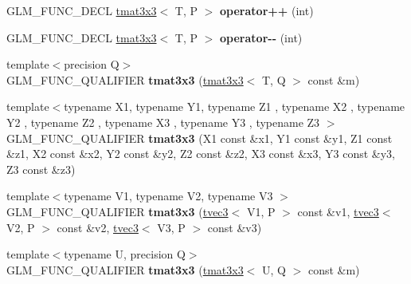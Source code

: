 \begin{DoxyCompactItemize}
\item 
G\+L\+M\+\_\+\+F\+U\+N\+C\+\_\+\+D\+E\+CL \hyperlink{structglm_1_1detail_1_1tmat3x3}{tmat3x3}$<$ T, P $>$ {\bfseries operator++} (int)\hypertarget{structglm_1_1detail_1_1tmat3x3_a42b606493a76f7246e3c4b6a0e10b064}{}\label{structglm_1_1detail_1_1tmat3x3_a42b606493a76f7246e3c4b6a0e10b064}

\item 
G\+L\+M\+\_\+\+F\+U\+N\+C\+\_\+\+D\+E\+CL \hyperlink{structglm_1_1detail_1_1tmat3x3}{tmat3x3}$<$ T, P $>$ {\bfseries operator-\/-\/} (int)\hypertarget{structglm_1_1detail_1_1tmat3x3_a9a9c2ddae87b15a9a7d7000dcd41e27a}{}\label{structglm_1_1detail_1_1tmat3x3_a9a9c2ddae87b15a9a7d7000dcd41e27a}

\item 
{\footnotesize template$<$precision Q$>$ }\\G\+L\+M\+\_\+\+F\+U\+N\+C\+\_\+\+Q\+U\+A\+L\+I\+F\+I\+ER {\bfseries tmat3x3} (\hyperlink{structglm_1_1detail_1_1tmat3x3}{tmat3x3}$<$ T, Q $>$ const \&m)\hypertarget{structglm_1_1detail_1_1tmat3x3_a2b14034fffb8d3dd7f1d6d24131f7510}{}\label{structglm_1_1detail_1_1tmat3x3_a2b14034fffb8d3dd7f1d6d24131f7510}

\item 
{\footnotesize template$<$typename X1, typename Y1, typename Z1 , typename X2 , typename Y2 , typename Z2 , typename X3 , typename Y3 , typename Z3 $>$ }\\G\+L\+M\+\_\+\+F\+U\+N\+C\+\_\+\+Q\+U\+A\+L\+I\+F\+I\+ER {\bfseries tmat3x3} (X1 const \&x1, Y1 const \&y1, Z1 const \&z1, X2 const \&x2, Y2 const \&y2, Z2 const \&z2, X3 const \&x3, Y3 const \&y3, Z3 const \&z3)\hypertarget{structglm_1_1detail_1_1tmat3x3_a6bc248bf277f1e4c97480b964301a9e2}{}\label{structglm_1_1detail_1_1tmat3x3_a6bc248bf277f1e4c97480b964301a9e2}

\item 
{\footnotesize template$<$typename V1, typename V2, typename V3 $>$ }\\G\+L\+M\+\_\+\+F\+U\+N\+C\+\_\+\+Q\+U\+A\+L\+I\+F\+I\+ER {\bfseries tmat3x3} (\hyperlink{structglm_1_1detail_1_1tvec3}{tvec3}$<$ V1, P $>$ const \&v1, \hyperlink{structglm_1_1detail_1_1tvec3}{tvec3}$<$ V2, P $>$ const \&v2, \hyperlink{structglm_1_1detail_1_1tvec3}{tvec3}$<$ V3, P $>$ const \&v3)\hypertarget{structglm_1_1detail_1_1tmat3x3_a4093d2793f9a8895d7632b8163849670}{}\label{structglm_1_1detail_1_1tmat3x3_a4093d2793f9a8895d7632b8163849670}

\item 
{\footnotesize template$<$typename U, precision Q$>$ }\\G\+L\+M\+\_\+\+F\+U\+N\+C\+\_\+\+Q\+U\+A\+L\+I\+F\+I\+ER {\bfseries tmat3x3} (\hyperlink{structglm_1_1detail_1_1tmat3x3}{tmat3x3}$<$ U, Q $>$ const \&m)\hypertarget{structglm_1_1detail_1_1tmat3x3_a5a59337ed9a816f87aa1c16300c670f8}{}\label{structglm_1_1detail_1_1tmat3x3_a5a59337ed9a816f87aa1c16300c670f8}


\end{DoxyCompactItemize}
